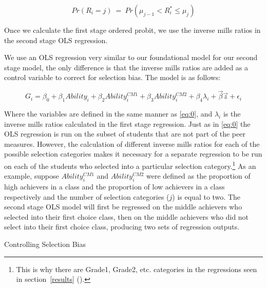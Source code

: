 \documentclass[12pt,a4paper,english,fleqn]{article}
\makeatletter
\newcommand{\sectlabel}[1]{section~\ref{#1} (\nameref{#1})}
\renewcommand\subsection{\@startsection{subsection}{2}
{\z@}{-3.25ex\@plus -1ex \@minus -.2ex}{1.5ex \@plus .2ex}{\normalfont\bf}}
\makeatother
\begin{document}
\setlength{\belowdisplayskip}{5pt} \setlength{\belowdisplayshortskip}{1pt}
\setlength{\abovedisplayskip}{-4pt} \setlength{\abovedisplayshortskip}{1pt}

\begin{equation}\label{eq:3}
Pr(R_{i} = j) \ = \ Pr(\mu_{j-1} < R_{i}^{*} \leq \mu_{j})
\end{equation}

\noindent Once we calculate the first stage ordered probit, we use the inverse mills ratios in the second stage OLS regression.

We use an OLS regression very similar to our foundational model for our second stage model, the only difference is that the inverse mills ratios are added as a control variable to correct for selection bias. The model is as follows:

\begin{equation}\label{eq:4}
G_{i} = \beta_{0} + \beta_{1} Ability_{i} + \beta_{2} Ability_{i}^{CM1} + \beta_{3} Ability_{i}^{CM2} + \beta_{4} \lambda_{i} + \overrightarrow{\beta} \overrightarrow{z} + \epsilon_{i}
\end{equation}

Where the variables are defined in the same manner as \eqref{eq:0}, and $\lambda_{i}$ is the inverse mills ratios calculated in the first stage regression.
Just as in \eqref{eq:0} the OLS regression is run on the subset of students that are not part of the peer measures. 
However, the calculation of different inverse mills ratios for each of the possible selection categories makes it necessary for a separate regression to be run on each of the students who selected into a particular selection category.\footnote{This is why there are Grade1, Grade2, etc. categories in the regressions seen in \sectlabel{results}.}
As an example, suppose $Ability_{i}^{CM1}$ and $Ability_{i}^{CM2}$ were defined as the proportion of high achievers in a class and the proportion of low achievers in a class respectively and the number of selection categories ($j$) is equal to two. 
The second stage OLS model will first be regressed on the middle achievers who selected into their first choice class, then on the middle achievers who did not select into their first choice class, producing two sets of regression outputs. 

\subsection{Controlling Selection Bias}\label{methods:csb}
\end{document}
